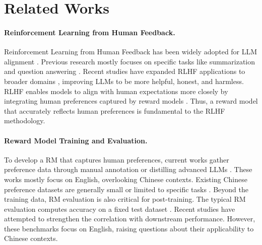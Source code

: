 \section{Related Works}
\paragraph{Reinforcement Learning from Human Feedback.}
Reinforcement Learning from Human Feedback has been widely adopted for LLM alignment \citep{ouyang2022traininglanguagemodelsfollow,bai2022traininghelpfulharmlessassistant}.
Previous research mostly focuses on specific tasks like summarization \citep{stiennon2022learningsummarizehumanfeedback} and question answering \citep{nakano2022webgptbrowserassistedquestionansweringhuman}. 
Recent studies have expanded RLHF applications to broader domains \citep{hou2024chatglmrlhfpracticesaligninglarge,lin2024baichuanalignmenttechnicalreport,yu2024codepmpscalablepreferencemodel}, improving LLMs to be more helpful, honest, and harmless. 
RLHF enables models to align with human expectations more closely by integrating human preferences captured by reward models \citep{10.5555/645529.657801,brown2019deepbayesianrewardlearning,palan2019learningrewardfunctionsintegrating}. 
Thus, a reward model that accurately reflects human preferences is fundamental to the RLHF methodology.

\paragraph{Reward Model Training and Evaluation.}
To develop a RM that captures human preferences, current works gather preference data through manual annotation \citep{bai2022traininghelpfulharmlessassistant,zheng2023judging} or distilling advanced LLMs \citep{starling2023,cui2023ultrafeedback}.
These works mostly focus on English, overlooking Chinese contexts.
Existing Chinese preference datasets are generally small \citep{huozi,zhihu_rlhf_3k} or limited to specific tasks \citep{Yang_Kyara_2024,DPO-zh-en-emoji2024,xu2023cvalues}.
Beyond the training data, RM evaluation is also critical for post-training. 
The typical RM evaluation computes accuracy on a fixed test dataset \citep{lambert2024rewardbenchevaluatingrewardmodels}.
Recent studies \citep{son2024llmasajudgerewardmodel,kim2024evaluatingrobustnessrewardmodels,zhou2024rmbcomprehensivelybenchmarkingreward,liu2024rmbenchbenchmarkingrewardmodels,frick2024evaluaterewardmodelsrlhf,gureja2024mrewardbenchevaluatingrewardmodels} have attempted to strengthen the correlation with downstream performance. 
However, these benchmarks focus on English, raising questions about their applicability to Chinese contexts.